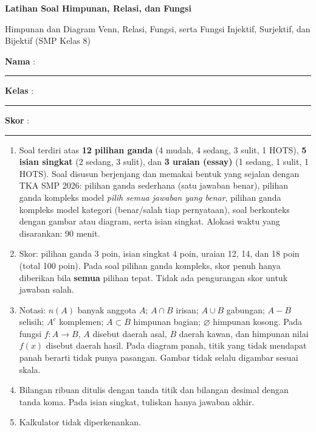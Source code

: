 \documentclass[a4paper,11pt]{article}
\newcounter{no}
\begin{document}
\thispagestyle{fancy}

\begin{center}
  {\color{mainc}\fontsize{22}{26}\selectfont\bfseries Latihan Soal Himpunan, Relasi, dan Fungsi\par}
  \vspace{2pt}
  {\color{accc}\large Himpunan dan Diagram Venn, Relasi, Fungsi, serta Fungsi Injektif, Surjektif, dan Bijektif (SMP Kelas 8)\par}
\end{center}
\vspace{2pt}
\begin{tcolorbox}[colback=softbg,colframe=mainc!40,boxrule=0.6pt,arc=3pt,left=8pt,right=8pt,top=5pt,bottom=5pt]
\noindent\textbf{Nama} : \rule{4.6cm}{0.4pt}\hfill\textbf{Kelas} : \rule{2.2cm}{0.4pt}\hfill\textbf{Skor} : \rule{2.2cm}{0.4pt}
\end{tcolorbox}
\vspace{2pt}
\begin{tcolorbox}[colback=white,colframe=accc,boxrule=0.8pt,arc=3pt,left=8pt,right=8pt,top=4pt,bottom=4pt,title={\bfseries Petunjuk Pengerjaan},coltitle=white,fonttitle=\small]
\small
\begin{enumerate}[leftmargin=1.4em,itemsep=1pt,topsep=1pt]
\item Soal terdiri atas \textbf{12 pilihan ganda} (4 mudah, 4 sedang, 3 sulit, 1 HOTS), \textbf{5 isian singkat} (2 sedang, 3 sulit), dan \textbf{3 uraian (essay)} (1 sedang, 1 sulit, 1 HOTS). Soal disusun berjenjang dan memakai bentuk yang sejalan dengan TKA SMP 2026: pilihan ganda sederhana (satu jawaban benar), pilihan ganda kompleks model \emph{pilih semua jawaban yang benar}, pilihan ganda kompleks model kategori (benar/salah tiap pernyataan), soal berkonteks dengan gambar atau diagram, serta isian singkat. Alokasi waktu yang disarankan: 90 menit.
\item Skor: pilihan ganda 3 poin, isian singkat 4 poin, uraian 12, 14, dan 18 poin (total 100 poin). Pada soal pilihan ganda kompleks, skor penuh hanya diberikan bila \textbf{semua} pilihan tepat. Tidak ada pengurangan skor untuk jawaban salah.
\item Notasi: $n(A)$ banyak anggota $A$; $A\cap B$ irisan; $A\cup B$ gabungan; $A-B$ selisih; $A^c$ komplemen; $A\subset B$ himpunan bagian; $\varnothing$ himpunan kosong. Pada fungsi $f:A\to B$, $A$ disebut daerah asal, $B$ daerah kawan, dan himpunan nilai $f(x)$ disebut daerah hasil. Pada diagram panah, titik yang tidak mendapat panah berarti tidak punya pasangan. Gambar tidak selalu digambar sesuai skala.
\item Bilangan ribuan ditulis dengan tanda titik dan bilangan desimal dengan tanda koma. Pada isian singkat, tuliskan hanya jawaban akhir.
\item Kalkulator tidak diperkenankan.
\end{enumerate}
\end{tcolorbox}
\end{document}
